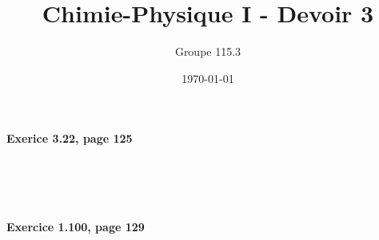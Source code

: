 \documentclass{article}
\title{Chimie-Physique I - Devoir 3}
\author{Groupe 115.3}
\date{\today}
\newcommand\exercice[1]{%
\paragraph{#1}%
~\par
~\par}
\begin{document}
\maketitle

\exercice{Exerice 3.22, page 125}

\exercice{Exercice 1.100, page 129}
\end{document}
